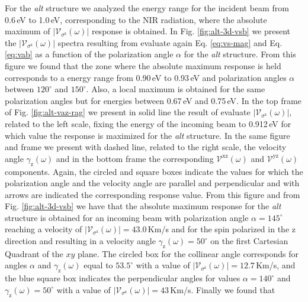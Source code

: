 \documentclass[prb,11pt,tightenlines,twocolumn,aps]{revtex4-1}
\begin{document}
For the \emph{alt} structure we analyzed the energy range for the incident beam
from 0.6\,eV to 1.0\,eV, corresponding to the NIR radiation, where the absolute
maximum of $|\mathcal{V}_{\sigma^{\mathrm{z}}}(\omega)|$ response is obtained.
% 
In Fig. \ref{fig:alt-3d-vsb} we present the
$|\mathcal{V}_{\sigma^{\mathrm{z}}}(\omega)|$ spectra resulting from evaluate
again Eq. \eqref{eq:vs-mag} and Eq. \eqref{eq:vab} as a function of the
polarization angle $\alpha$ for the \emph{alt} structure.
% 
From this figure we found that the zone where the absolute maximum response is
held corresponds to a energy range from 0.90\,eV to 0.93\,eV and polarization
angles $\alpha$ between $120^{\circ}$ and $150^{\circ}$. Also, a local maximum
is obtained for the same polarization angles but for energies between 0.67\,eV
and 0.75\,eV.
In the top frame of Fig. \ref{fig:alt-vaz-rag} we present in solid line the
result of evaluate $|\mathcal{V}_{\sigma^{\mathrm{z}}}(\omega)|$, related to the
left scale, fixing the energy of the incoming beam to 0.912\,eV for which value
the response is maximized for the \emph{alt} structure. In the same figure and
frame we present with dashed line, related to the right scale, the velocity
angle $\gamma_{\mathrm{z}}(\omega)$ and in the bottom frame the corresponding
$\mathcal{V}^{\mathrm{xz}}(\omega)$ and $\mathcal{V}^{\mathrm{yz}}(\omega)$
components. Again, the circled and square boxes indicate the values for which
the polarization angle and the velocity angle are parallel and perpendicular and
with arrows are indicated the corresponding response value.
% 
From this figure and from Fig. \ref{fig:alt-3d-vsb} we have that the absolute
maximum response for the \emph{alt} structure is obtained for an incoming beam
with polarization angle $\alpha=145^{\circ}$ reaching a velocity of
$|\mathcal{V}_{\sigma^{\mathrm{z}}}(\omega)|=43.0$\,Km/s and for the spin
polarized in the $\mathrm{z}$ direction and resulting in a velocity angle
$\gamma_{\mathrm{z}}(\omega)=50^{\circ}$ on the first Cartesian Quadrant of the
$xy$ plane. The circled box for the collinear angle corresponds for angles
$\alpha$ and $\gamma_{\mathrm{z}}(\omega)$ equal to $53.5^{\circ}$ with a value
of $|\mathcal{V}_{\sigma^{\mathrm{z}}}(\omega)|=12.7$\,Km/s, and the blue square
box indicates the perpendicular angles for values $\alpha=140^{\circ}$ and
$\gamma_{\mathrm{z}}(\omega)=50^{\circ}$ with a value of
$|\mathcal{V}_{\sigma^{\mathrm{z}}}(\omega)|=43$\,Km/s. Finally we found that
\end{document}
